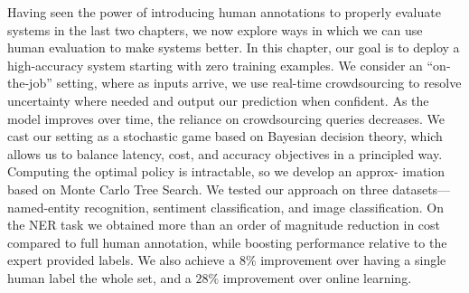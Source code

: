 Having seen the power of introducing human annotations to properly evaluate systems in the last two chapters, we now explore ways in which we can use human evaluation to make systems better.
In this chapter, our goal is to deploy a high-accuracy system starting with zero training examples.
We consider an ``on-the-job'' setting, where as inputs arrive, we use real-time crowdsourcing to resolve uncertainty where needed and output our prediction when confident. As the model improves over time, the reliance on crowdsourcing queries
decreases. We cast our setting as a stochastic game based on Bayesian decision
theory, which allows us to balance latency, cost, and accuracy objectives in a principled way. Computing the optimal policy is intractable, so we develop an approx-
imation  based on Monte Carlo Tree Search. We tested our approach on three
datasets---named-entity recognition, sentiment classification, and image classification. On the NER task we obtained more than an order of magnitude reduction in cost compared to full
human annotation, while boosting performance relative to the expert provided labels. We also achieve a $8\%$ \fone{} improvement over having a single
human label the whole set, and a $28\%$ \fone{} improvement over online learning.
